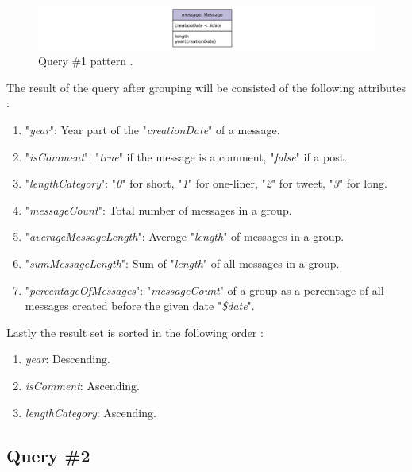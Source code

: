 {\begin{enumerate}
\end{enumerate}

\begin{figure}[H]
\centering
\includegraphics[width=1\textwidth]{pics/Query1.png}
\caption{Query \#1 pattern \cite{prat2017ldbc}.}
\label{fig:Query1}
\end{figure} 


The result of the query after grouping will be consisted of the following attributes \cite{prat2017ldbc}:

\begin{enumerate}
\item "\textit{year}": Year part of the "\textit{creationDate}" of a message.
\item "\textit{isComment}": "\textit{true}" if the message is a comment, "\textit{false}" if a post.
\item "\textit{lengthCategory}": "\textit{0}" for short, "\textit{1}" for one-liner, "\textit{2}" for tweet, "\textit{3}" for long.
\item "\textit{messageCount}": Total number of messages in a group.
\item "\textit{averageMessageLength}": Average "\textit{length}" of messages in a group.
\item "\textit{sumMessageLength}": Sum of "\textit{length}" of all messages in a group.
\item "\textit{percentageOfMessages}": "\textit{messageCount}" of a group as a percentage of all messages created before the given date "\textit{\$date}".

\end{enumerate}

Lastly the result set is sorted in the following order \cite{prat2017ldbc}:

\begin{enumerate}

\item \textit{year}: Descending.
\item \textit{isComment}: Ascending.
\item \textit{lengthCategory}: Ascending.

\end{enumerate}


\subsection{Query \#2}
\label{subsec:qry2}

}

